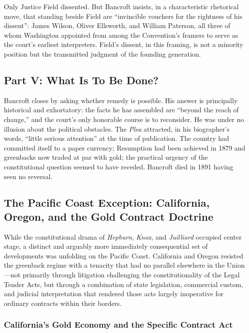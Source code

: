 \documentclass[12pt]{article}
\begin{document}
Only Justice Field dissented. But Bancroft insists, in a characteristic
rhetorical move, that standing beside Field are ``invincible vouchers for
the rightness of his dissent'': James Wilson, Oliver Ellsworth, and
William Paterson, all three of whom Washington appointed from among the
Convention's framers to serve as the court's earliest interpreters.
Field's dissent, in this framing, is not a minority position but the
transmitted judgment of the founding generation.

\subsection{Part V: What Is To Be Done?}

Bancroft closes by asking whether remedy is possible. His answer is
principally historical and exhortatory: the facts he has assembled are
``beyond the reach of change,'' and the court's only honorable course is
to reconsider. He was under no illusion about the political obstacles.
The \textit{Plea} attracted, in his biographer's words, ``little serious
attention'' at the time of publication. The country had committed itself
to a paper currency; Resumption had been achieved in 1879 and greenbacks
now traded at par with gold; the practical urgency of the constitutional
question seemed to have receded. Bancroft died in 1891 having seen no
reversal.

\subsection{The Pacific Coast Exception: California, Oregon, and the Gold
Contract Doctrine}

While the constitutional drama of \textit{Hepburn}, \textit{Knox}, and
\textit{Juilliard} occupied center stage, a distinct and arguably more
immediately consequential set of developments was unfolding on the Pacific
Coast. California and Oregon resisted the greenback regime with a tenacity
that had no parallel elsewhere in the Union---not primarily through
litigation challenging the constitutionality of the Legal Tender Acts, but
through a combination of state legislation, commercial custom, and judicial
interpretation that rendered those acts largely inoperative for ordinary
contracts within their borders.

\subsubsection*{California's Gold Economy and the Specific Contract Act}
\end{document}
